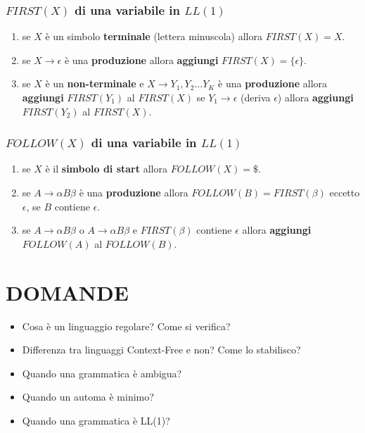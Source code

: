 \documentclass[12pt]{extarticle}
\begin{document}
\subsubsection{$FIRST(X)$ di una variabile in $LL(1)$}
\begin{enumerate}
    \item se $X$ è un simbolo \textbf{terminale} (lettera minuscola) allora $FIRST(X)=X$.
    \item se $X \rightarrow \epsilon$ è una \textbf{produzione} allora \textbf{aggiungi} $FIRST(X)=\{\epsilon\}$.
    \item se $X$ è un \textbf{non-terminale} e $X \rightarrow Y_1,Y_2\dots Y_K$ è una \textbf{produzione} allora \textbf{aggiungi} $FIRST(Y_1)$ al $FIRST(X)$
            se $Y_1 \rightarrow \epsilon$ (deriva $\epsilon$) allora \textbf{aggiungi} $FIRST(Y_2)$ al $FIRST(X)$.
\end{enumerate}

\subsubsection{$FOLLOW(X)$ di una variabile in $LL(1)$}
\begin{enumerate}
    \item se $X$ è il \textbf{simbolo di start} allora $FOLLOW(X)=\$$.
    \item se $A \rightarrow \alpha B \beta$ è una \textbf{produzione} allora $FOLLOW(B)=FIRST(\beta)$ eccetto $\epsilon$, se $B$ contiene $\epsilon$.
    \item se $A \rightarrow \alpha B \beta$ o $A \rightarrow \alpha B \beta$ e $FIRST(\beta)$ contiene $\epsilon$ allora \textbf{aggiungi} $FOLLOW(A)$ al $FOLLOW(B)$.
\end{enumerate}

\newpage

\section{DOMANDE}
\begin{itemize}
    \item Cosa è un linguaggio regolare? Come si verifica?
    \item Differenza tra linguaggi Context-Free e non? Come lo stabilisco?
    \item Quando una grammatica è ambigua?
    \item Quando un automa è minimo?
    \item Quando una grammatica è LL(1)?
\end{itemize}
\end{document}
